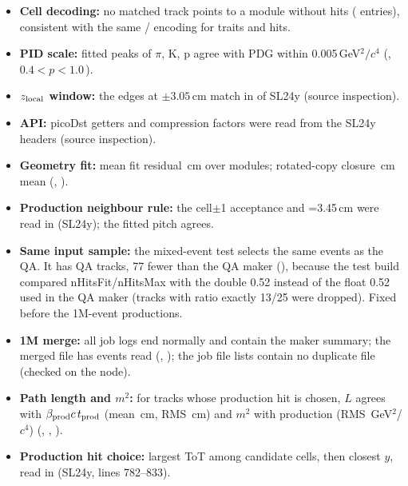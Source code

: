 \begin{itemize}
  (, full test sample).
\item \textbf{Cell decoding:} no matched track points to a module without hits
  (\nMatchedInEmpty{} entries), consistent with the same / encoding for traits and hits.
\item \textbf{PID scale:} fitted \mtwo{} peaks of $\pi$, K, p agree with PDG within 0.005\,GeV$^2/c^4$
  (, $0.4<p<1.0$\,\GeVc).
\item \textbf{$z_{\rm local}$ window:} the edges at $\pm3.05$\,cm match  in
   of SL24y (source inspection).
\item \textbf{API:} picoDst getters and compression factors were read from the SL24y
   headers (source inspection).
\item \textbf{Geometry fit:} mean fit residual \geoFitRmsTest\,cm over \geoNFitTest{} modules; rotated-copy closure
  \geoClosureMeanTest\,cm mean (, ).
\item \textbf{Production neighbour rule:} the cell$\pm$1 acceptance and =3.45\,cm were read in
   (SL24y); the fitted pitch agrees.
\item \textbf{Same input sample:} the mixed-event test selects the same \meEvtSelTest{} events as the QA. It has
  \meNTrkQATest{} QA tracks, 77 fewer than the QA maker (\nTrkEta), because the test build compared
  nHitsFit/nHitsMax with the double 0.52 instead of the float 0.52 used in the QA maker (tracks with ratio exactly
  13/25 were dropped). Fixed before the 1M-event productions.
\item \textbf{1M merge:} all \meNJobsVthree{} job logs end normally and contain the maker summary; the merged file has
  \meEvtAllVthree{} events read (, ); the job file lists contain no
  duplicate file (checked on the node).
\item \textbf{Path length and $m^2$:} for tracks whose production hit is chosen, $L$ agrees with $\beta_{\rm prod}c\,t_{\rm prod}$
  (mean \mtDLMeanVthree\,cm, RMS \mtDLRmsVthree\,cm) and $m^2$ with production (RMS \mtDmRmsVthree\,GeV$^2$/$c^4$)
  (, , ).
\item \textbf{Production hit choice:} largest ToT among candidate cells, then closest $y$, read in
   (SL24y, lines 782--833).

\end{itemize}
